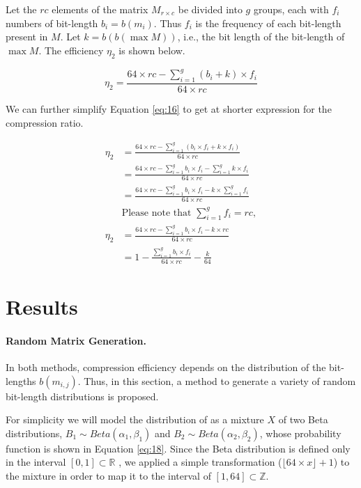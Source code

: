 \documentclass[10pt]{article}
\begin{document}
Let the $rc$ elements of the matrix $M_{r \times c}$ be divided into $g$ groups, each with $f_i$ numbers of bit-length $b_i = b(m_i)$. Thus $f_i$ is the frequency of each bit-length present in $M$. Let $k = b(b(\max M))$, i.e., the bit length of the bit-length of $\max M$. The efficiency $\eta_2$ is shown below.

\begin{equation}\label{eq:16}
 \eta_2 = \frac{64 \times rc - \sum_{i=1}^{g} ( b_i + k ) \times f_i }{64 \times rc} 
\end{equation}

We can further simplify Equation \ref{eq:16} to get at shorter expression for the compression ratio.

\begin{align} \label{eq:17}
 \eta_2 &= \frac{64 \times rc - \sum_{i=1}^{g} ( b_i \times f_i + k \times f_i )}{64 \times rc} \nonumber \\
  &= \frac{64 \times rc - \sum_{i=1}^{g}  b_i \times f_i  -\sum_{i=1}^{g}  k \times f_i }{64 \times rc}\nonumber \\
  &= \frac{64 \times rc - \sum_{i=1}^{g}  b_i \times f_i  - k \times\sum_{i=1}^{g}  f_i }{64 \times rc}\nonumber \\
 &\textrm{Please note that }\sum_{i=1}^{g} f_i = rc, \nonumber \\
 \eta_2 &= \frac{64 \times rc - \sum_{i=1}^{g}  b_i \times f_i  - k \times rc }{64 \times rc}\nonumber \\
  &= 1 - \frac{\sum_{i=1}^{g}  b_i \times f_i }{64 \times rc} - \frac{k}{64}
\end{align}

\section*{Results}

\paragraph{Random Matrix Generation.}
In both methods, compression efficiency depends on the distribution of the bit-lengths $b(m_{i,j})$. Thus, in this section, a method to generate a variety of random bit-length distributions is proposed.

For simplicity we will model the distribution of  as a mixture $X$ of two Beta distributions, $B_1 \sim Beta(\alpha_1,\beta_1)$ and $B_2 \sim Beta(\alpha_2,\beta_2)$, whose probability function is shown in Equation \ref{eq:18}. Since the Beta distribution is defined only in the interval $[0,1] \subset \mathbb{R}$ , we applied a simple transformation ($\lfloor 64 \times x \rfloor + 1$) to the mixture in order to map it to the interval of $[1,64] \subset \mathbb{Z}$.
\end{document}
